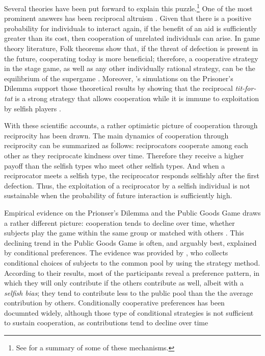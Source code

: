 \documentclass[12pt]{article}
\begin{document}
Several theories have been put forward to explain this puzzle.\footnote{See \citet{Nowak2006} for a summary of some of these mechanisms.} One of the most prominent answers has been reciprocal altruism \citep{Trivers1971, Axelrod1981-ot, may1987more, nowak1992tit,Nowak1993-gl}. Given that there is a positive probability for individuals to interact again, if the benefit of an aid is sufficiently greater than its cost, then cooperation of unrelated individuals can arise. In game theory literature, Folk theorems show that, if the threat of defection is present in the future, cooperating today is more beneficial; therefore, a cooperative strategy in the stage game, as well as any other individually rational strategy, can be the equilibrium of the supergame \citep{Friedman1971-nz, Fudenberg1986-dz}. Moreover, \citeauthor{Axelrod1980a}'s simulations on the Prisoner's Dilemma support those theoretical results by showing that the reciprocal \textit{tit-for-tat} is a strong strategy that allows cooperation while it is immune to exploitation by selfish players \citep{Axelrod1980a,Axelrod1980b,Axelrod1981-ot}. 

With these scientific accounts, a rather optimistic picture of cooperation through reciprocity has been drawn. The main dynamics of cooperation through reciprocity can be summarized as follows: reciprocators cooperate among each other as they reciprocate kindness over time. Therefore they receive a higher payoff than the selfish types who meet other selfish types. And when a reciprocator meets a selfish type, the reciprocator responds selfishly after the first defection. Thus, the exploitation of a reciprocator by a selfish individual is not sustainable when the probability of future interaction is sufficiently high. 

Empirical evidence on the Prionser's Dilemma and the Public Goods Game draws a rather different picture: cooperation tends to decline over time, whether subjects play the game within the same group or matched with others \citep{Selten1986-uc, Andreoni1993-ys, Cooper1996-be, ledyard1994public, Kim1984-wm, Isaac1985-qz, Andreoni2008-ec}. This declining trend in the Public Goods Game is often, and arguably best, explained by conditional preferences. The evidence was provided by \citet{Fischbacher2001}, who collects conditional choices of subjects to the common pool by using the strategy method. According to their results, most of the participants reveal a preference pattern, in which they will only contribute if the others contribute as well, albeit with a \textit{selfish bias}; they tend to contribute less to the public pool than the the average contribution by others. Conditionally cooperative preferences has been documnted widely, although those type of conditional strategies is not sufficient to sustain cooperation, as contributions tend to decline over time \citep{Kocher2008, Herrmann2009, Neugebauer2009, Fischbacher2010, ChaudhuriSustCoopExEc2011, hartig2015conditioning, andreozzi2020stability}
\end{document}
